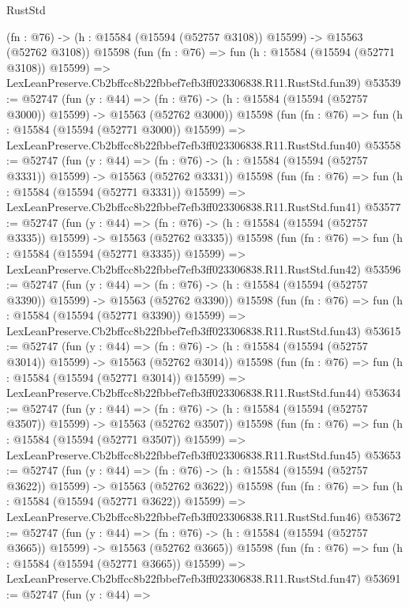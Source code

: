 \begin{lexlean}{RustStd}
\begin{coremodule}
    (fn : @76) -> (h : @15584 (@15594 (@52757 @3108)) @15599) -> @15563 (@52762 @3108))
    @15598
    (fun (fn : @76) =>
    fun (h : @15584 (@15594 (@52771 @3108)) @15599) =>
    LexLeanPreserve.Cb2bffcc8b22fbbef7efb3ff023306838.R11.RustStd.fun39)
@53539 := @52747
    (fun (y : @44) =>
    (fn : @76) -> (h : @15584 (@15594 (@52757 @3000)) @15599) -> @15563 (@52762 @3000))
    @15598
    (fun (fn : @76) =>
    fun (h : @15584 (@15594 (@52771 @3000)) @15599) =>
    LexLeanPreserve.Cb2bffcc8b22fbbef7efb3ff023306838.R11.RustStd.fun40)
@53558 := @52747
    (fun (y : @44) =>
    (fn : @76) -> (h : @15584 (@15594 (@52757 @3331)) @15599) -> @15563 (@52762 @3331))
    @15598
    (fun (fn : @76) =>
    fun (h : @15584 (@15594 (@52771 @3331)) @15599) =>
    LexLeanPreserve.Cb2bffcc8b22fbbef7efb3ff023306838.R11.RustStd.fun41)
@53577 := @52747
    (fun (y : @44) =>
    (fn : @76) -> (h : @15584 (@15594 (@52757 @3335)) @15599) -> @15563 (@52762 @3335))
    @15598
    (fun (fn : @76) =>
    fun (h : @15584 (@15594 (@52771 @3335)) @15599) =>
    LexLeanPreserve.Cb2bffcc8b22fbbef7efb3ff023306838.R11.RustStd.fun42)
@53596 := @52747
    (fun (y : @44) =>
    (fn : @76) -> (h : @15584 (@15594 (@52757 @3390)) @15599) -> @15563 (@52762 @3390))
    @15598
    (fun (fn : @76) =>
    fun (h : @15584 (@15594 (@52771 @3390)) @15599) =>
    LexLeanPreserve.Cb2bffcc8b22fbbef7efb3ff023306838.R11.RustStd.fun43)
@53615 := @52747
    (fun (y : @44) =>
    (fn : @76) -> (h : @15584 (@15594 (@52757 @3014)) @15599) -> @15563 (@52762 @3014))
    @15598
    (fun (fn : @76) =>
    fun (h : @15584 (@15594 (@52771 @3014)) @15599) =>
    LexLeanPreserve.Cb2bffcc8b22fbbef7efb3ff023306838.R11.RustStd.fun44)
@53634 := @52747
    (fun (y : @44) =>
    (fn : @76) -> (h : @15584 (@15594 (@52757 @3507)) @15599) -> @15563 (@52762 @3507))
    @15598
    (fun (fn : @76) =>
    fun (h : @15584 (@15594 (@52771 @3507)) @15599) =>
    LexLeanPreserve.Cb2bffcc8b22fbbef7efb3ff023306838.R11.RustStd.fun45)
@53653 := @52747
    (fun (y : @44) =>
    (fn : @76) -> (h : @15584 (@15594 (@52757 @3622)) @15599) -> @15563 (@52762 @3622))
    @15598
    (fun (fn : @76) =>
    fun (h : @15584 (@15594 (@52771 @3622)) @15599) =>
    LexLeanPreserve.Cb2bffcc8b22fbbef7efb3ff023306838.R11.RustStd.fun46)
@53672 := @52747
    (fun (y : @44) =>
    (fn : @76) -> (h : @15584 (@15594 (@52757 @3665)) @15599) -> @15563 (@52762 @3665))
    @15598
    (fun (fn : @76) =>
    fun (h : @15584 (@15594 (@52771 @3665)) @15599) =>
    LexLeanPreserve.Cb2bffcc8b22fbbef7efb3ff023306838.R11.RustStd.fun47)
@53691 := @52747
    (fun (y : @44) =>

\end{coremodule}
\end{lexlean}
